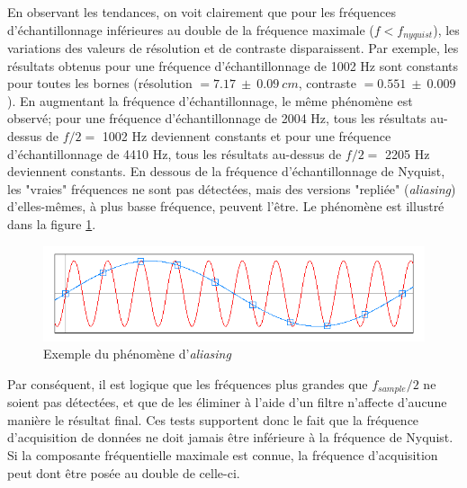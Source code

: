 ﻿\documentclass[11pt,letterpaper]{article}
\begin{document}
En observant les tendances, on voit clairement que pour les fréquences d'échantillonnage inférieures au double
de la fréquence maximale ($f<f_{nyquist}$), les variations des valeurs de résolution et de contraste disparaissent. Par exemple,
les résultats obtenus pour une fréquence d'échantillonnage de 1002 Hz sont constants pour toutes les bornes (résolution $=7.17\ \pm \ 0.09\ cm$,
contraste $=0.551\ \pm\ 0.009$). En augmentant la fréquence d'échantillonnage, le même phénomène est observé; pour une fréquence d'échantillonnage de 
2004 Hz, tous les résultats au-dessus de $f/2=$ 1002 Hz deviennent constants et pour une fréquence d'échantillonnage de 4410 Hz, tous les résultats au-dessus de
$f/2=$ 2205 Hz deviennent constants. En dessous de la fréquence d'échantillonnage de Nyquist, les "vraies" fréquences ne sont pas détectées, mais des versions "repliée"
(\textit{aliasing}) d'elles-mêmes, à plus basse fréquence, peuvent l'être. Le phénomène est illustré dans la figure \ref{aliasing}. 
\begin{figure}[H]
    \centering
    \includegraphics[scale=0.5]{Aliasing-plot.png}
    \caption{Exemple du phénomène d'\textit{aliasing} \cite{nyquist}}
    \label{aliasing}
\end{figure}

Par conséquent, il est logique que les fréquences plus grandes que $f_{sample}/2$ ne soient pas détectées, et que 
de les éliminer  à l'aide d'un filtre n'affecte d'aucune manière le résultat final. Ces tests supportent donc le fait que la fréquence 
d'acquisition de données ne doit jamais être inférieure à la fréquence de Nyquist. Si la composante fréquentielle maximale est 
connue, la fréquence d'acquisition peut dont être posée au double de celle-ci. 
\end{document}
